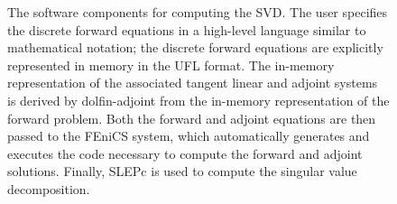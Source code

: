 \documentclass{siamltex}
\begin{document}
\begin{figure}
\centering
{}
\caption{
The software components for computing the SVD. 
    The user specifies the discrete forward equations in a
    high-level language similar to mathematical notation; the discrete
    forward equations are explicitly represented in memory in the UFL
    format. The in-memory representation of the associated
    tangent linear and adjoint systems is derived by dolfin-adjoint 
    from the in-memory representation of the forward
    problem.  Both the forward and adjoint equations are then passed
    to the FEniCS system, which automatically generates and executes
    the code necessary to compute the forward and adjoint solutions.
Finally, SLEPc is used to compute the singular value decomposition. 
}\label{fig:software_components}
\end{figure}
\end{document}
